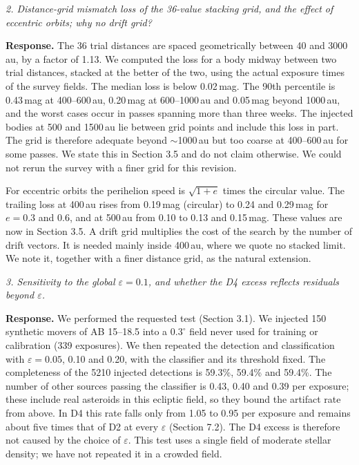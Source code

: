 \documentclass[11pt]{article}
\newenvironment{referee}{\par\color{black!60}\itshape}{\par}
\newcommand{\resp}{\par\noindent\textbf{Response.} }
\begin{document}
\begin{referee}
2. Distance-grid mismatch loss of the 36-value stacking grid, and the effect of eccentric orbits; why no drift grid?
\end{referee}
\resp The 36 trial distances are spaced geometrically between 40 and 3000\,au, by a factor of 1.13. We computed the loss for a body midway between two trial distances, stacked at the better of the two, using the actual exposure times of the survey fields. The median loss is below 0.02\,mag. The 90th percentile is 0.43\,mag at 400--600\,au, 0.20\,mag at 600--1000\,au and 0.05\,mag beyond 1000\,au, and the worst cases occur in passes spanning more than three weeks. The injected bodies at 500 and 1500\,au lie between grid points and include this loss in part. The grid is therefore adequate beyond $\sim$1000\,au but too coarse at 400--600\,au for some passes. We state this in Section 3.5 and do not claim otherwise. We could not rerun the survey with a finer grid for this revision.

For eccentric orbits the perihelion speed is $\sqrt{1+e}$ times the circular value. The trailing loss at 400\,au rises from 0.19\,mag (circular) to 0.24 and 0.29\,mag for $e = 0.3$ and 0.6, and at 500\,au from 0.10 to 0.13 and 0.15\,mag. These values are now in Section 3.5. A drift grid multiplies the cost of the search by the number of drift vectors. It is needed mainly inside 400\,au, where we quote no stacked limit. We note it, together with a finer distance grid, as the natural extension.

\begin{referee}
3. Sensitivity to the global $\varepsilon = 0.1$, and whether the D4 excess reflects residuals beyond $\varepsilon$.
\end{referee}
\resp We performed the requested test (Section 3.1). We injected 150 synthetic movers of AB 15--18.5 into a $0.3^\circ$ field never used for training or calibration (339 exposures). We then repeated the detection and classification with $\varepsilon = 0.05$, 0.10 and 0.20, with the classifier and its threshold fixed. The completeness of the 5210 injected detections is 59.3\%, 59.4\% and 59.4\%. The number of other sources passing the classifier is 0.43, 0.40 and 0.39 per exposure; these include real asteroids in this ecliptic field, so they bound the artifact rate from above. In D4 this rate falls only from 1.05 to 0.95 per exposure and remains about five times that of D2 at every $\varepsilon$ (Section 7.2). The D4 excess is therefore not caused by the choice of $\varepsilon$. This test uses a single field of moderate stellar density; we have not repeated it in a crowded field.
\end{document}
